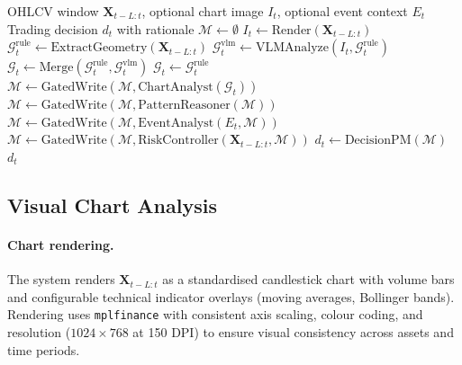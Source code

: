 \begin{algorithm}[t]
\caption{FinVL-MAS Decision Pipeline}
\label{alg:pipeline}
\begin{algorithmic}[1]
\REQUIRE OHLCV window $\mathbf{X}_{t-L:t}$, optional chart image $I_t$, optional event context $E_t$
\ENSURE Trading decision $d_t$ with rationale
\STATE $\mathcal{M} \leftarrow \emptyset$ \hfill {}
\STATE $I_t \leftarrow \text{Render}(\mathbf{X}_{t-L:t})$ \hfill {}
\STATE $\mathcal{G}_t^{\text{rule}} \leftarrow \text{ExtractGeometry}(\mathbf{X}_{t-L:t})$ \hfill {}
    \STATE $\mathcal{G}_t^{\text{vlm}} \leftarrow \text{VLMAnalyze}(I_t, \mathcal{G}_t^{\text{rule}})$
    \STATE $\mathcal{G}_t \leftarrow \text{Merge}(\mathcal{G}_t^{\text{rule}}, \mathcal{G}_t^{\text{vlm}})$
\ELSE
    \STATE $\mathcal{G}_t \leftarrow \mathcal{G}_t^{\text{rule}}$
\ENDIF
\STATE $\mathcal{M} \leftarrow \text{GatedWrite}(\mathcal{M}, \text{ChartAnalyst}(\mathcal{G}_t))$
\STATE $\mathcal{M} \leftarrow \text{GatedWrite}(\mathcal{M}, \text{PatternReasoner}(\mathcal{M}))$
\STATE $\mathcal{M} \leftarrow \text{GatedWrite}(\mathcal{M}, \text{EventAnalyst}(E_t, \mathcal{M}))$
\STATE $\mathcal{M} \leftarrow \text{GatedWrite}(\mathcal{M}, \text{RiskController}(\mathbf{X}_{t-L:t}, \mathcal{M}))$
\STATE $d_t \leftarrow \text{DecisionPM}(\mathcal{M})$ \hfill {}
\RETURN $d_t$
\end{algorithmic}
\end{algorithm}

\subsection{Visual Chart Analysis}
\label{sec:visual}

\paragraph{Chart rendering.}
The system renders $\mathbf{X}_{t-L:t}$ as a standardised candlestick chart with volume bars and configurable technical indicator overlays (moving averages, Bollinger bands). Rendering uses \texttt{mplfinance} with consistent axis scaling, colour coding, and resolution ($1024 \times 768$ at 150 DPI) to ensure visual consistency across assets and time periods.

